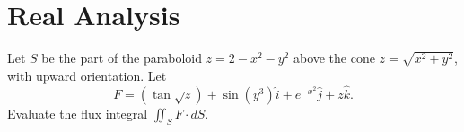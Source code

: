 \section{Real Analysis}
\begin{problem}
	Let $ S $ be the part of the paraboloid $ z = 2 - x^2 - y^2 $ above the cone $ z = \sqrt{x^2+y^2} $, with upward orientation. Let
	\[ F = (\tan\sqrt{z}) + \sin(y^3) \hat{i} + e^{-x^2} \hat{j} + z \hat{k}. \]
	Evaluate the flux integral $ \iint_S F\cdot dS.\ $
\end{problem}

